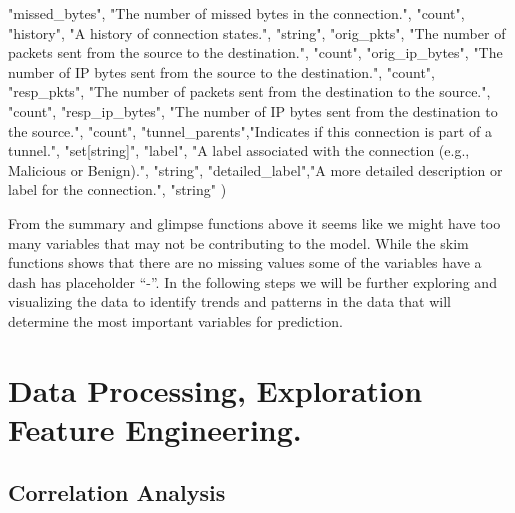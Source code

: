 \documentclass[
]{article}
\newenvironment{Shaded}{\begin{snugshade}}{\end{snugshade}}
\newcommand{\NormalTok}[1]{#1}
\newcommand{\StringTok}[1]{\textcolor[rgb]{0.31,0.60,0.02}{#1}}
\begin{document}
\begin{Shaded}
\begin{Highlighting}[]
  \StringTok{"missed\_bytes"}\NormalTok{,  }\StringTok{"The number of missed bytes in the connection."}\NormalTok{, }\StringTok{"count"}\NormalTok{,}
  \StringTok{"history"}\NormalTok{,       }\StringTok{"A history of connection states."}\NormalTok{,             }\StringTok{"string"}\NormalTok{,}
  \StringTok{"orig\_pkts"}\NormalTok{,     }\StringTok{"The number of packets sent from the source to the destination."}\NormalTok{, }\StringTok{"count"}\NormalTok{,}
  \StringTok{"orig\_ip\_bytes"}\NormalTok{, }\StringTok{"The number of IP bytes sent from the source to the destination."}\NormalTok{, }\StringTok{"count"}\NormalTok{,}
  \StringTok{"resp\_pkts"}\NormalTok{,     }\StringTok{"The number of packets sent from the destination to the source."}\NormalTok{, }\StringTok{"count"}\NormalTok{,}
  \StringTok{"resp\_ip\_bytes"}\NormalTok{, }\StringTok{"The number of IP bytes sent from the destination to the source."}\NormalTok{, }\StringTok{"count"}\NormalTok{,}
  \StringTok{"tunnel\_parents"}\NormalTok{,}\StringTok{"Indicates if this connection is part of a tunnel."}\NormalTok{, }\StringTok{"set[string]"}\NormalTok{,}
  \StringTok{"label"}\NormalTok{,         }\StringTok{"A label associated with the connection (e.g., \textquotesingle{}Malicious\textquotesingle{} or \textquotesingle{}Benign\textquotesingle{})."}\NormalTok{, }\StringTok{"string"}\NormalTok{,}
  \StringTok{"detailed\_label"}\NormalTok{,}\StringTok{"A more detailed description or label for the connection."}\NormalTok{, }\StringTok{"string"}
\NormalTok{)}
\end{Highlighting}
\end{Shaded}

From the summary and glimpse functions above it seems like we might have
too many variables that may not be contributing to the model. While the
skim functions shows that there are no missing values some of the
variables have a dash has placeholder ``-''. In the following steps we
will be further exploring and visualizing the data to identify trends
and patterns in the data that will determine the most important
variables for prediction.

\hypertarget{data-processing-exploration-feature-engineering.}{%
\section{Data Processing, Exploration Feature
Engineering.}\label{data-processing-exploration-feature-engineering.}}

\hypertarget{correlation-analysis}{%
\subsection{Correlation Analysis}\label{correlation-analysis}}
\end{document}
